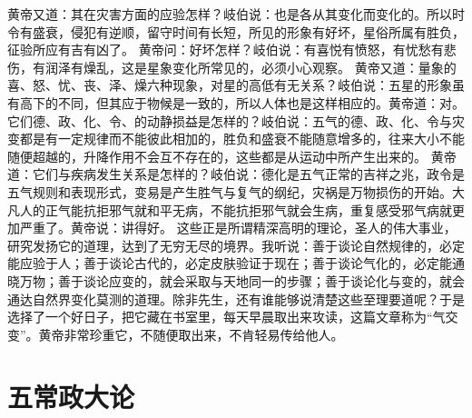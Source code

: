 \documentclass[a4paper,12pt,UTF8,twoside]{ctexbook}
\begin{document}
黄帝又道：其在灾害方面的应验怎样？岐伯说：也是各从其变化而变化的。所以时令有盛衰，侵犯有逆顺，留守时间有长短，所见的形象有好坏，星俗所属有胜负，征验所应有吉有凶了。
黄帝问：好坏怎样？岐伯说：有喜悦有愤怒，有忧愁有悲伤，有润泽有燥乱，这是星象变化所常见的，必须小心观察。
黄帝又道：量象的喜、怒、忧、丧、泽、燥六种现象，对星的高低有无关系？岐伯说：五星的形象虽有高下的不同，但其应于物候是一致的，所以人体也是这样相应的。黄帝道：对。
它们德、政、化、令、的动静损益是怎样的？岐伯说：五气的德、政、化、令与灾变都是有一定规律而不能彼此相加的，胜负和盛衰不能随意增多的，往来大小不能随便超越的，升降作用不会互不存在的，这些都是从运动中所产生出来的。
黄帝道：它们与疾病发生关系是怎样的？岐伯说：德化是五气正常的吉祥之兆，政令是五气规则和表现形式，变易是产生胜气与复气的纲纪，灾祸是万物损伤的开始。大凡人的正气能抗拒邪气就和平无病，不能抗拒邪气就会生病，重复感受邪气病就更加严重了。黄帝说：讲得好。
这些正是所谓精深高明的理论，圣人的伟大事业，研究发扬它的道理，达到了无穷无尽的境界。我听说：善于谈论自然规律的，必定能应验于人；善于谈论古代的，必定皮肤验证于现在；善于谈论气化的，必定能通晓万物；善于谈论应变的，就会采取与天地同一的步骤；善于谈论化与变的，就会通达自然界变化莫测的道理。除非先生，还有谁能够说清楚这些至理要道呢？于是选择了一个好日子，把它藏在书室里，每天早晨取出来攻读，这篇文章称为“气交变”。黄帝非常珍重它，不随便取出来，不肯轻易传给他人。

\chapter{五常政大论}
\end{document}
